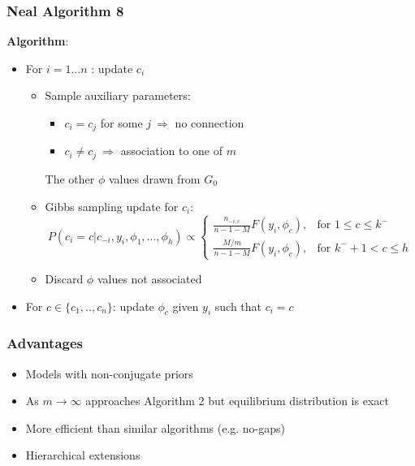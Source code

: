 \documentclass{beamer}
\begin{document}
\begin{frame} %
	\frametitle{Neal Algorithm 8}
	\textbf{Algorithm}:
		\begin{itemize}
		    \item For $i= 1...n$ : update $c_{i}$  \\
		        \begin{itemize}
		            \item Sample auxiliary parameters: \\ \begin{itemize}
		                \item $c_{i}=c_{j}$ for some $j\ \Rightarrow$ no connection \\
		                \item $c_{i}\neq c_{j} \ \Rightarrow$ association to one of $m$
		            \end{itemize} 

		            The other $\phi$ values drawn from $G_{0}$ \\
		            \item Gibbs sampling update for $c_{i}$: %
		                \begin{displaymath}
		                    P(c_{i}=c | c_{-i}, y_{i}, \phi_{1},...,\phi_{h}) \propto \begin{cases}  \frac{n_{-i,c}}{n-1-M}F(y_{i},\phi_{c}), & \mbox{for } 1 \leq c \leq k^{-} \\ \frac{M/m}{n-1-M}F(y_{i},\phi_{c}), & \mbox{for } k^{-}+1 < c \leq h
		                \end{cases}
		                \end{displaymath}
                    \item Discard $\phi$ values not associated
                    
                \end{itemize} 
        
            \item For $c \in \{c_{1},..,c_{n}\}$: update $\phi_{c}$ given $y_{i}$ such that $c_{i}=c$
            
		\end{itemize}
		
\end{frame}


\begin{frame} %
	\frametitle{Advantages}
	\begin{itemize}
	    \item  Models with non-conjugate priors
	    \item As $m \rightarrow \infty $ approaches Algorithm 2 but equilibrium distribution is exact 
	    \item More efficient than similar algorithms (e.g. no-gaps) %
	    \item Hierarchical extensions
	\end{itemize}

	
		
\end{frame}
\end{document}

